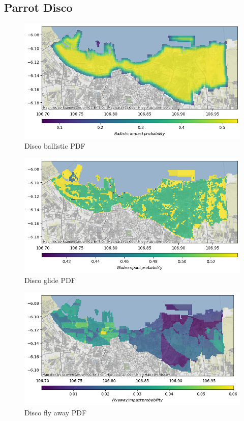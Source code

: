 \documentclass[12pt]{report}
\begin{document}
        \subsection{Parrot Disco}
        \begin{figure}[H]
            \centering
            \includegraphics[width=\textwidth]{Plot/parrot/ballistic_pdf.png}
            \caption{Disco ballistic PDF}
        \end{figure}
        \begin{figure}[H]
            \centering
            \includegraphics[width=\textwidth]{Plot/parrot/glide_pdf.png}
            \caption{Disco glide PDF}
        \end{figure}
        \begin{figure}[H]
            \centering
            \includegraphics[width=\textwidth]{Plot/parrot/fly_away_pdf.png}
            \caption{Disco fly away PDF}
        \end{figure}
\end{document}
